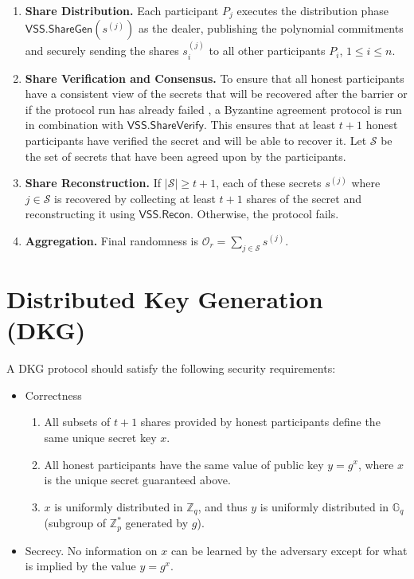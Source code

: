 \documentclass[letterpaper,twocolumn,10pt]{article}
\theoremstyle{definition}
\theoremstyle{remark}
\begin{document}
\begin{enumerate}
    \item \textbf{Share Distribution.} Each participant $P_j$ executes the distribution phase $\mathsf{VSS.ShareGen}(s^{(j)})$ as the dealer, publishing the polynomial commitments and securely sending the shares $s_i^{(j)}$ to all other participants $P_i$, $1\le i\le n$.
    \item \textbf{Share Verification and Consensus.} To ensure that all honest participants have a consistent view of the secrets that will be recovered after the barrier or if the protocol run has already failed , a Byzantine agreement protocol is run in combination with $\mathsf{VSS.ShareVerify}$. This ensures that at least $t + 1$ honest participants have verified the secret and will be able to recover it. Let $\mathcal{S}$ be the set of secrets that have been agreed upon by the participants.
    \item \textbf{Share Reconstruction.} If $\lvert \mathcal{S} \rvert \ge t + 1$, each of these secrets $s^{(j)}$ where $j \in \mathcal{S}$ is recovered by collecting at least $t + 1$ shares of the secret and reconstructing it using $\mathsf{VSS.Recon}$. Otherwise, the protocol fails.
    \item \textbf{Aggregation.} Final randomness is $\mathcal{O}_r = \sum_{j \in \mathcal{S}} s^{(j)}$.
    
\end{enumerate}

\section{Distributed Key Generation (DKG)}
\label{appendix:dkg}
A DKG protocol should satisfy the following security requirements:
\begin{itemize}
    \item Correctness
        \begin{enumerate}
        \item All subsets of $t + 1$ shares provided by honest participants define the same unique secret key $x$.
        \item All honest participants have the same value of public key $y=g^x$, where $x$ is the unique secret guaranteed above.
        \item $x$ is uniformly distributed in $\mathbb{Z}_q$, and thus $y$ is uniformly distributed in $\mathbb{G}_q$ (subgroup of $\mathbb{Z}^*_p$ generated by $g$).
        \end{enumerate}
        
    \item Secrecy. No information on $x$ can be learned by the adversary except for what is implied by the value $y = g^x$.
\end{itemize}
\end{document}
